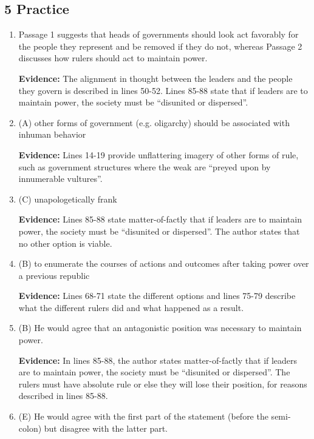 \begin{enumerate}
\subsection{5 Practice}
\begin{enumerate}
\item Passage 1 suggests that heads of governments should look act favorably
for the people they represent and be removed if they do not, whereas
Passage 2 discusses how rulers should act to maintain power.

\textbf{Evidence:} The alignment in thought between the leaders and the people they govern is described in lines 50-52. Lines 85-88 state that if leaders are to maintain power, the society must be ``disunited or dispersed''.

\bigskip
\item (A) other forms of government (e.g. oligarchy) should be associated with
inhuman behavior

\textbf{Evidence:} Lines 14-19 provide unflattering imagery of other forms of rule, such as government structures where the weak are ``preyed upon by innumerable vultures''.

\bigskip
\item (C) unapologetically frank

\textbf{Evidence:} Lines 85-88 state matter-of-factly that if leaders are to maintain power, the society must be ``disunited or dispersed''. The author states that no other option is viable. 

\bigskip
\item (B) to enumerate the courses of actions and outcomes after taking power
over a previous republic

\textbf{Evidence:} Lines 68-71 state the different options and lines 75-79 describe what the different rulers did and what happened as a result. 

\bigskip
\item (B) He would agree that an antagonistic position was necessary to maintain
power.

\textbf{Evidence:} In lines 85-88, the author states matter-of-factly that if leaders are to maintain power, the society must be ``disunited or dispersed''. The rulers must have absolute rule or else they will lose their position, for reasons described in lines 85-88.

\bigskip
\item (E) He would agree with the first part of the statement (before the semi-colon) but disagree with the latter part.


\end{enumerate}
\end{enumerate}
